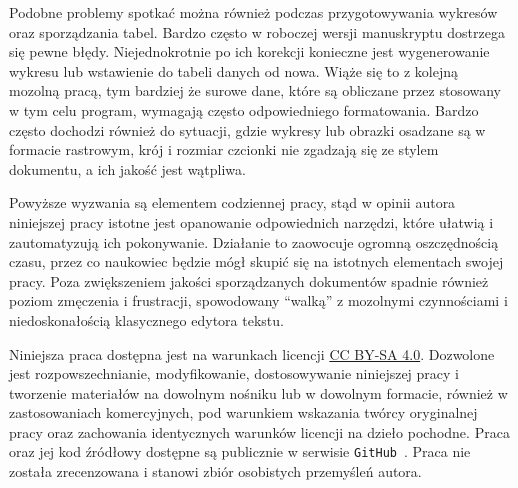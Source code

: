 Podobne problemy spotkać można również podczas przygotowywania wykresów oraz sporządzania tabel. Bardzo często w roboczej wersji manuskryptu dostrzega się pewne błędy. Niejednokrotnie po ich korekcji konieczne jest wygenerowanie wykresu lub wstawienie do tabeli danych od nowa. Wiąże się to z kolejną mozolną pracą, tym bardziej że surowe dane, które są obliczane przez stosowany w tym celu program, wymagają często odpowiedniego formatowania. Bardzo często dochodzi również do sytuacji, gdzie wykresy lub obrazki osadzane są w formacie rastrowym, krój i rozmiar czcionki nie zgadzają się ze stylem dokumentu, a ich jakość jest wątpliwa.

Powyższe wyzwania są elementem codziennej pracy, stąd w opinii autora niniejszej pracy istotne jest opanowanie odpowiednich narzędzi, które ułatwią i zautomatyzują ich pokonywanie. Działanie to zaowocuje ogromną oszczędnością czasu, przez co naukowiec będzie mógł skupić się na istotnych elementach swojej pracy. Poza zwiększeniem jakości sporządzanych dokumentów spadnie również poziom zmęczenia i frustracji, spowodowany \enquote{walką} z mozolnymi czynnościami i niedoskonałością klasycznego edytora tekstu.

Niniejsza praca dostępna jest na warunkach licencji \href{https://creativecommons.org/licenses/by-sa/4.0}{CC BY-SA 4.0}. Dozwolone jest rozpowszechnianie, modyfikowanie, dostosowywanie niniejszej pracy i tworzenie materiałów na dowolnym nośniku lub w dowolnym formacie, również w zastosowaniach komercyjnych, pod warunkiem wskazania twórcy oryginalnej pracy oraz zachowania identycznych warunków licencji na dzieło pochodne. Praca oraz jej kod źródłowy dostępne są publicznie w serwisie \texttt{GitHub}~\cite{auth_this}. Praca nie została zrecenzowana i stanowi zbiór osobistych przemyśleń autora.
